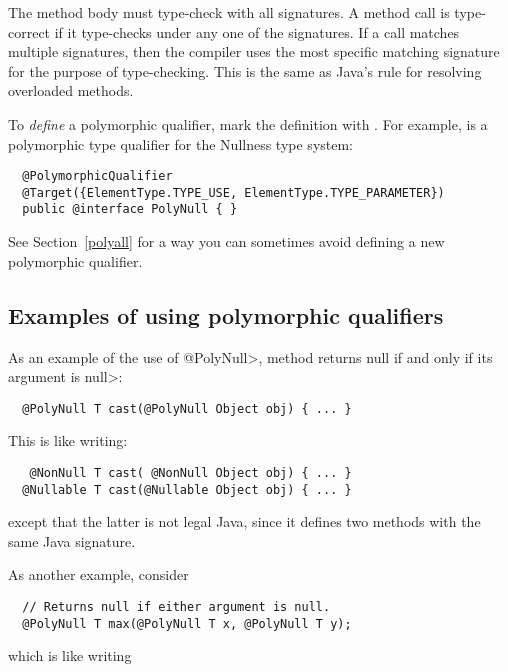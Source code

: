 The method body must type-check with all signatures.  A method call is
type-correct if it type-checks under any one of the signatures.  If a call
matches multiple signatures, then the compiler uses the most specific
matching signature for the purpose of type-checking.  This is the same as
Java's rule for resolving overloaded methods.

To \emph{define} a polymorphic qualifier, mark the definition with
.  For example,
 is a polymorphic type
qualifier for the Nullness type system:

\begin{Verbatim}
  @PolymorphicQualifier
  @Target({ElementType.TYPE_USE, ElementType.TYPE_PARAMETER})
  public @interface PolyNull { }
\end{Verbatim}

\noindent
See Section~\ref{polyall} for a way you can sometimes avoid defining a new
polymorphic qualifier.


\subsection{Examples of using polymorphic qualifiers\label{qualifier-polymorphism-examples}}

As an example of the use of \<@PolyNull>, method
returns null if and only if its argument is \<null>:

\begin{Verbatim}
  @PolyNull T cast(@PolyNull Object obj) { ... }
\end{Verbatim}

\noindent
This is like writing:

\begin{Verbatim}
   @NonNull T cast( @NonNull Object obj) { ... }
  @Nullable T cast(@Nullable Object obj) { ... }
\end{Verbatim}

\noindent
except that the latter is not legal Java, since it defines two
methods with the same Java signature.


As another example, consider

\begin{Verbatim}
  // Returns null if either argument is null.
  @PolyNull T max(@PolyNull T x, @PolyNull T y);
\end{Verbatim}

\noindent
which is like writing

